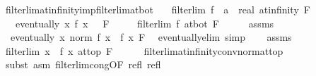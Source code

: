 \begin{isabellebody}
\isamarkupfalse%
%
\endisatagproof
{\isafoldproof}%
%
\isadelimproof
\isanewline
%
\endisadelimproof
\isanewline
{}\isamarkupfalse%
\ filterlim{\isacharunderscore}{\kern0pt}at{\isacharunderscore}{\kern0pt}infinity{\isacharunderscore}{\kern0pt}imp{\isacharunderscore}{\kern0pt}filterlim{\isacharunderscore}{\kern0pt}at{\isacharunderscore}{\kern0pt}bot{\isacharcolon}{\kern0pt}\isanewline
\ \ \ {\isachardoublequoteopen}filterlim\ {\isacharparenleft}{\kern0pt}f\ {\isacharcolon}{\kern0pt}{\isacharcolon}{\kern0pt}\ {\isacharprime}{\kern0pt}a\ {\isasymRightarrow}\ real{\isacharparenright}{\kern0pt}\ at{\isacharunderscore}{\kern0pt}infinity\ F{\isachardoublequoteclose}\isanewline
\ \ \ {\isachardoublequoteopen}eventually\ {\isacharparenleft}{\kern0pt}{\isasymlambda}x{\isachardot}{\kern0pt}\ f\ x\ {\isacharless}{\kern0pt}\ {}{\isacharparenright}{\kern0pt}\ F{\isachardoublequoteclose}\isanewline
\ \ \ \ \ {\isachardoublequoteopen}filterlim\ f\ at{\isacharunderscore}{\kern0pt}bot\ F{\isachardoublequoteclose}\isanewline
%
\isadelimproof
%
\endisadelimproof
%
\isatagproof
{}\isamarkupfalse%
\ {\isacharminus}{\kern0pt}\isanewline
\ \ \isamarkupfalse%
\ assms{\isacharparenleft}{\kern0pt}{}{\isacharparenright}{\kern0pt}\ \isamarkupfalse%
\ {\isacharasterisk}{\kern0pt}{\isacharcolon}{\kern0pt}\ {\isachardoublequoteopen}eventually\ {\isacharparenleft}{\kern0pt}{\isasymlambda}x{\isachardot}{\kern0pt}\ norm\ {\isacharparenleft}{\kern0pt}f\ x{\isacharparenright}{\kern0pt}\ {\isacharequal}{\kern0pt}\ {\isacharminus}{\kern0pt}f\ x{\isacharparenright}{\kern0pt}\ F{\isachardoublequoteclose}\ \isamarkupfalse%
\ eventually{\isacharunderscore}{\kern0pt}elim\ simp\isanewline
\ \ \isamarkupfalse%
\ assms{\isacharparenleft}{\kern0pt}{}{\isacharparenright}{\kern0pt}\ \isamarkupfalse%
\ {\isachardoublequoteopen}filterlim\ {\isacharparenleft}{\kern0pt}{\isasymlambda}x{\isachardot}{\kern0pt}\ {\isacharminus}{\kern0pt}\ f\ x{\isacharparenright}{\kern0pt}\ at{\isacharunderscore}{\kern0pt}top\ F{\isachardoublequoteclose}\isanewline
\ \ \ \ \isamarkupfalse%
\ filterlim{\isacharunderscore}{\kern0pt}at{\isacharunderscore}{\kern0pt}infinity{\isacharunderscore}{\kern0pt}conv{\isacharunderscore}{\kern0pt}norm{\isacharunderscore}{\kern0pt}at{\isacharunderscore}{\kern0pt}top\isanewline
\ \ \ \ \isamarkupfalse%
\ {\isacharparenleft}{\kern0pt}subst\ {\isacharparenleft}{\kern0pt}asm{\isacharparenright}{\kern0pt}\ filterlim{\isacharunderscore}{\kern0pt}cong{\isacharbrackleft}{\kern0pt}OF\ refl\ refl\ {\isacharasterisk}{\kern0pt}{\isacharbrackright}{\kern0pt}{\isacharparenright}{\kern0pt}\isanewline

\end{isabellebody}
